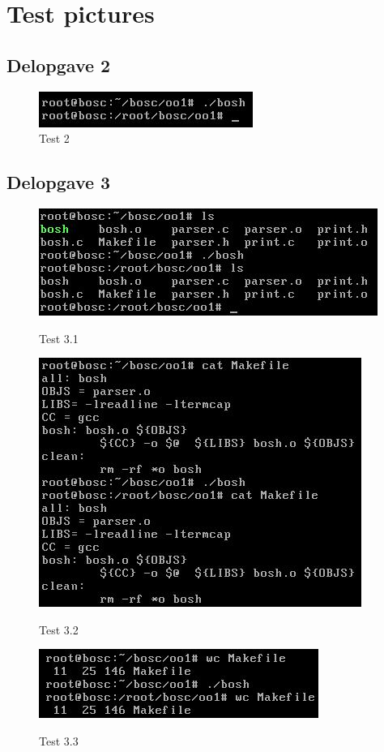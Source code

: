 \chapter{Test pictures}
\section{Delopgave 2}
\begin{figure}[h!]
\centering
\includegraphics{Images/TestOfPart2}
\caption{Test 2}
\label{Test2}
\end{figure}

\section{Delopgave 3}
\begin{figure}[h!]
\centering
\caption{Test 3.1}
\includegraphics{Images/TestOfPart3_1}
\label{Test3_1}
\end{figure}

\begin{figure}[h!]
\centering
\caption{Test 3.2}
\includegraphics{Images/TestOfPart3_2}
\label{Test3_2}
\end{figure}

\begin{figure}[h!]
\centering
\caption{Test 3.3}
\includegraphics{Images/TestOfPart3_3}
\label{Test3_3}
\end{figure}

